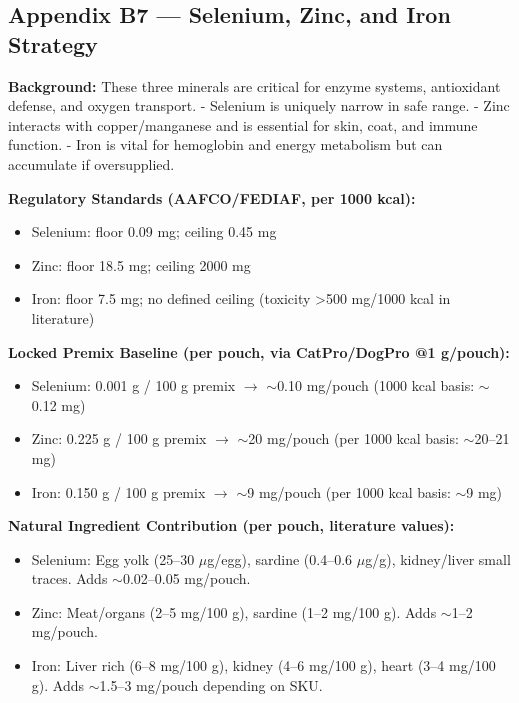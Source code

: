 \subsection*{Appendix B7 --- Selenium, Zinc, and Iron Strategy}

\textbf{Background:}  
These three minerals are critical for enzyme systems, antioxidant defense, and oxygen transport.  
- Selenium is uniquely narrow in safe range.  
- Zinc interacts with copper/manganese and is essential for skin, coat, and immune function.  
- Iron is vital for hemoglobin and energy metabolism but can accumulate if oversupplied.  

\textbf{Regulatory Standards (AAFCO/FEDIAF, per 1000 kcal):}  
\begin{itemize}[leftmargin=1.2em]
  \item Selenium: floor 0.09 mg; ceiling 0.45 mg  
  \item Zinc: floor 18.5 mg; ceiling 2000 mg  
  \item Iron: floor 7.5 mg; no defined ceiling (toxicity >500 mg/1000 kcal in literature)  
\end{itemize}

\textbf{Locked Premix Baseline (per pouch, via CatPro/DogPro @1 g/pouch):}  
\begin{itemize}[leftmargin=1.2em]
  \item Selenium: 0.001 g / 100 g premix $\rightarrow$ $\sim$0.10 mg/pouch (1000 kcal basis: $\sim$0.12 mg)  
  \item Zinc: 0.225 g / 100 g premix $\rightarrow$ $\sim$20 mg/pouch (per 1000 kcal basis: $\sim$20--21 mg)  
  \item Iron: 0.150 g / 100 g premix $\rightarrow$ $\sim$9 mg/pouch (per 1000 kcal basis: $\sim$9 mg)  
\end{itemize}

\textbf{Natural Ingredient Contribution (per pouch, literature values):}  
\begin{itemize}[leftmargin=1.2em]
  \item Selenium: Egg yolk (25--30 $\mu$g/egg), sardine (0.4--0.6 $\mu$g/g), kidney/liver small traces. Adds $\sim$0.02--0.05 mg/pouch.  
  \item Zinc: Meat/organs (2--5 mg/100 g), sardine (1--2 mg/100 g). Adds $\sim$1--2 mg/pouch.  
  \item Iron: Liver rich (6--8 mg/100 g), kidney (4--6 mg/100 g), heart (3--4 mg/100 g). Adds $\sim$1.5--3 mg/pouch depending on SKU.  
\end{itemize}

